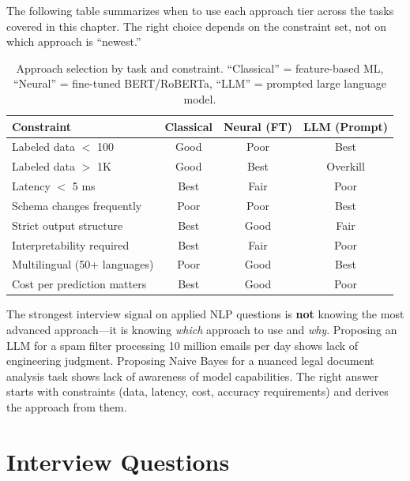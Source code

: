 The following table summarizes when to use each approach tier across the tasks covered in
this chapter.  The right choice depends on the constraint set, not on which approach is
``newest.''

\begin{table}[H]
\centering
\caption{Approach selection by task and constraint.  ``Classical'' = feature-based ML,
``Neural'' = fine-tuned BERT/RoBERTa, ``LLM'' = prompted large language model.}
\label{tab:task_approach_selection}
\small
\begin{tabular}{@{}lccc@{}}
\toprule
\textbf{Constraint} & \textbf{Classical} & \textbf{Neural (FT)} & \textbf{LLM (Prompt)} \\
\midrule
Labeled data $<$ 100          & Good      & Poor     & Best     \\
Labeled data $>$ 1K           & Good      & Best     & Overkill \\
Latency $<$ 5 ms              & Best      & Fair     & Poor     \\
Schema changes frequently     & Poor      & Poor     & Best     \\
Strict output structure       & Best      & Good     & Fair     \\
Interpretability required     & Best      & Fair     & Poor     \\
Multilingual (50+ languages)  & Poor      & Good     & Best     \\
Cost per prediction matters   & Best      & Good     & Poor     \\
\bottomrule
\end{tabular}
\end{table}

\begin{warningbox}
The strongest interview signal on applied NLP questions is \textbf{not} knowing the most
advanced approach---it is knowing \emph{which} approach to use and \emph{why}.  Proposing an
LLM for a spam filter processing 10 million emails per day shows lack of engineering judgment.
Proposing Naive Bayes for a nuanced legal document analysis task shows lack of awareness of
model capabilities.  The right answer starts with constraints (data, latency, cost, accuracy
requirements) and derives the approach from them.
\end{warningbox}

\section{Interview Questions}
\label{sec:practical_tasks_interview}

